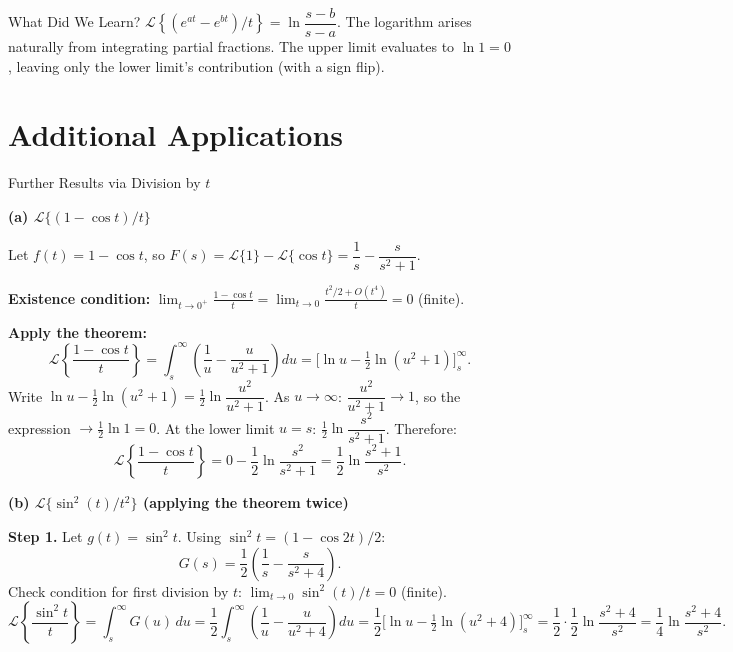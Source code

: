 \documentclass[12pt,a4paper]{article}
\begin{document}
\begin{learnbox}{What Did We Learn?}
$\mathcal{L}\!\left\{(e^{at}-e^{bt})/t\right\} = \ln\dfrac{s-b}{s-a}$.
The logarithm arises naturally from integrating partial fractions.
The upper limit evaluates to $\ln 1 = 0$, leaving only the lower limit's
contribution (with a sign flip).
\end{learnbox}

\section{Additional Applications}

\begin{infobox}{Further Results via Division by $t$}

\textbf{(a) $\mathcal{L}\{(1-\cos t)/t\}$}

Let $f(t) = 1-\cos t$, so
$F(s) = \mathcal{L}\{1\} - \mathcal{L}\{\cos t\} = \dfrac{1}{s} - \dfrac{s}{s^2+1}$.

\textbf{Existence condition:}
$\displaystyle\lim_{t\to 0^+}\frac{1-\cos t}{t} = \lim_{t\to 0}\frac{t^2/2+O(t^4)}{t} = 0$
(finite). \checkmark

\textbf{Apply the theorem:}
\[
  \mathcal{L}\!\left\{\frac{1-\cos t}{t}\right\}
  = \int_s^\infty \left(\frac{1}{u} - \frac{u}{u^2+1}\right) du
  = \Big[\ln u - \tfrac{1}{2}\ln(u^2+1)\Big]_s^\infty.
\]
Write $\ln u - \frac{1}{2}\ln(u^2+1) = \frac{1}{2}\ln\dfrac{u^2}{u^2+1}$.
As $u\to\infty$: $\dfrac{u^2}{u^2+1}\to 1$, so the expression $\to \frac{1}{2}\ln 1 = 0$.
At the lower limit $u=s$: $\frac{1}{2}\ln\dfrac{s^2}{s^2+1}$.
Therefore:
\[
  \mathcal{L}\!\left\{\frac{1-\cos t}{t}\right\}
  = 0 - \frac{1}{2}\ln\frac{s^2}{s^2+1}
  = \frac{1}{2}\ln\frac{s^2+1}{s^2}.
\]

\medskip
\textbf{(b) $\mathcal{L}\{\sin^2(t)/t^2\}$ (applying the theorem twice)}

\textbf{Step 1.} Let $g(t)=\sin^2 t$. Using $\sin^2 t = (1-\cos 2t)/2$:
\[
  G(s) = \frac{1}{2}\left(\frac{1}{s} - \frac{s}{s^2+4}\right).
\]
Check condition for first division by $t$: $\lim_{t\to 0}\sin^2(t)/t = 0$ (finite). \checkmark
\[
  \mathcal{L}\!\left\{\frac{\sin^2 t}{t}\right\}
  = \int_s^\infty G(u)\,du
  = \frac{1}{2}\int_s^\infty\!\!\left(\frac{1}{u}-\frac{u}{u^2+4}\right)du
  = \frac{1}{2}\Big[\ln u - \tfrac{1}{2}\ln(u^2+4)\Big]_s^\infty
  = \frac{1}{2}\cdot\frac{1}{2}\ln\frac{s^2+4}{s^2}
  = \frac{1}{4}\ln\frac{s^2+4}{s^2}.
\]


\end{infobox}
\end{document}
